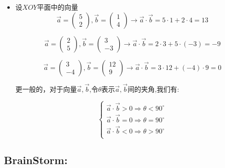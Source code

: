\documentclass[UTF8]{article}
\begin{document}
\begin{itemize}
	\item 设$XOY$平面中的向量$$\vec{a} = 
\left(
\begin{array}{l}
5\\
2
\end{array}
\right),
\vec{b} = 
\left(
\begin{array}{l}
1\\
4
\end{array}
\right)\to \vec{a}\cdot\vec{b} = 5\cdot 1 + 2\cdot 4 = 13
$$

$$\vec{a} = 
\left(
\begin{array}{l}
2\\
5
\end{array}
\right),
\vec{b} = 
\left(
\begin{array}{l}
3\\
-3
\end{array}
\right)\to \vec{a}\cdot\vec{b} = 2\cdot 3 + 5\cdot (-3) = -9$$

$$\vec{a} = 
\left(
\begin{array}{l}
3\\
-4
\end{array}
\right),
\vec{b} = 
\left(
\begin{array}{l}
12\\
9
\end{array}
\right)\to \vec{a}\cdot\vec{b} = 3\cdot 12 + (-4)\cdot 9 = 0$$

更一般的，对于向量$\vec{a}, \vec{b}$,令$\theta$表示$\vec{a}, \vec{b}$间的夹角,我们有:

$$
\left\{
\begin{array}{l}
\vec{a}\cdot\vec{b} > 0 \Rightarrow \theta < 90^{\circ}\\
\vec{a}\cdot\vec{b} = 0 \Rightarrow \theta = 90^{\circ}\\
\vec{a}\cdot\vec{b} < 0 \Rightarrow \theta > 90^{\circ}\\
\end{array}
\right.
$$
\end{itemize}

\subsection{BrainStorm:}
\end{document}
